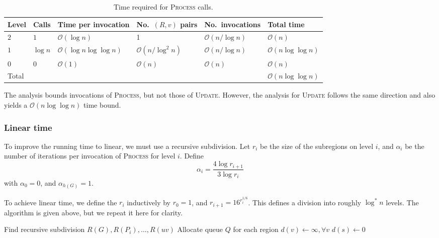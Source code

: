 \documentclass[11pt]{article}
\newcommand{\ra}[1]{\renewcommand{\arraystretch}{#1}}
\begin{document}
\begin{table}[!h]\centering
\caption{Time required for \textsc{Process} calls.}
\label{tab:process}
\ra{1.3}
\begin{tabular}{@{}llllll@{}} \toprule
  Level & Calls & Time per invocation & No.\ $(R,v)$ pairs & No.\ invocations & Total time\\ \midrule
  $2$ & $1$ & $\mathcal{O}(\log n)$ & 1 & $\mathcal{O}(n/\log n)$ & $\mathcal{O}(n)$\\
  $1$ & $\log n$ & $\mathcal{O}(\log n \log \log n)$ & $\mathcal{O}(n/\log^2 n)$ & $\mathcal{O}(n/\log n)$ & $\mathcal{O}(n\log \log n)$\\
  $0$ & $0$ & $\mathcal{O}(1)$ & $\mathcal{O}(n)$ & $\mathcal{O}(n)$ & $\mathcal{O}(n)$\\ \midrule
  Total & & & & & $\mathcal{O}(n\log \log n)$\\
  \bottomrule
\end{tabular}
\end{table}

The analysis bounds invocations of \textsc{Process}, but not those of \textsc{Update}. However, the analysis for \textsc{Update} follows the same direction and also yields a $\mathcal{O}(n \log \log n)$ time bound.

\subsubsection{Linear time}
\label{sec:linear-time}

To improve the running time to linear, we must use a recursive subdivision. Let $r_i$ be the size of the subregions on level $i$, and $\alpha_i$ be the number of iterations per invocation of \textsc{Process} for level $i$. Define
\[
  \alpha_i = \frac{4\log r_{i+1}}{3 \log r_i}
\]
with $\alpha_0 = 0$, and $\alpha_{h(G)} = 1$.

To achieve linear time, we define the $r_i$ inductively by $r_0 = 1$, and $r_{i+1} = 16^{r_i^{1/6}}$. This defines a division into roughly $\log^{*} n$ levels. The algorithm is given above, but we repeat it here for clarity.

\begin{algorithm}[!htb]
  \begin{algorithmic}[1]
    \State Find recursive subdivision $R(G), R(P_i), \ldots, R(uv)$
    \State Allocate queue $Q$ for each region
    \State $d(v) \gets \infty, \forall v$
    \State $d(s) \gets 0$
      \State {}
    \EndFor
      \State {}
    \EndWhile
  \end{algorithmic}
\end{algorithm}
\end{document}

